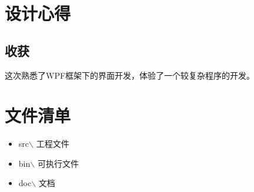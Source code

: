 \documentclass[12pt,a4paper]{article}
\begin{document}
\section{设计心得}
\subsection{收获}
这次熟悉了WPF框架下的界面开发，体验了一个较复杂程序的开发。
\section{文件清单}
\begin{itemize}
\item src$\backslash$ 工程文件
\item bin$\backslash$ 可执行文件
\item doc$\backslash$ 文档
\end{itemize}
\end{document}
